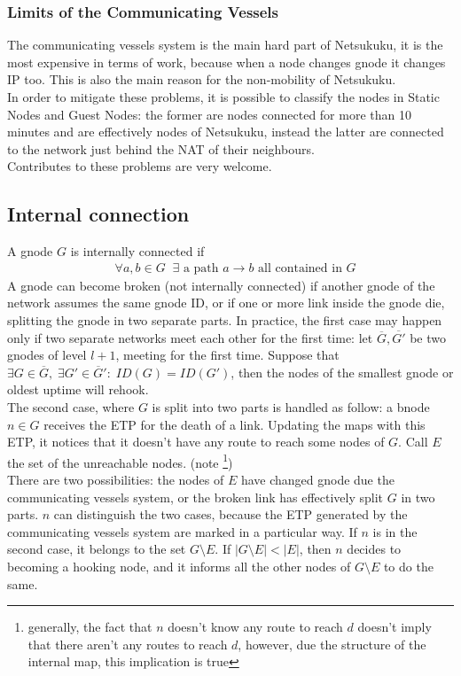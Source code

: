 \documentclass[a4paper]{article}
\newcommand{\T}[1]{\textrm{#1}}
\newcommand{\eal}[1]{{\begin{align*} #1 \end{align*}}}
\def\ove#1{{\overline{#1}}}
\def\-{{\setminus}}
\begin{document}
\subsubsection{Limits of the Communicating Vessels}
The communicating vessels system is the main hard part of Netsukuku, it is the
most expensive in terms of work, because when a node changes gnode it changes
IP too. This is also the main reason for the non-mobility of Netsukuku.\\
In order to mitigate these problems, it is possible to classify the nodes in
Static Nodes and Guest Nodes: the former are nodes connected for more than 10
minutes and are effectively nodes of Netsukuku, instead the latter are
connected to the network just behind the NAT of their neighbours.\\

Contributes to these problems are very welcome.

\subsection{Internal connection}
A gnode $G$ is internally connected if
\eal{&\forall a,b\in G\;\;\exists \T{ a path $a\rightarrow b$ all contained in $G$}}
A gnode can become broken (not internally connected) if another gnode of the
network assumes the same gnode ID, or if one or more link inside the gnode
die, splitting the gnode in two separate parts. In practice, the
first case may happen only if two separate networks meet each other for the
first time: let $\ove G, \ove {G'}$ be two gnodes of level $l+1$, meeting for the first time. 
Suppose that $\exists G\in \ove G,\;\exists G'\in \ove G':\; ID(G)=ID(G')$, then the nodes 
of the smallest gnode or oldest uptime will rehook.\\
The second case, where $G$ is split into two parts is handled as follow:
a bnode $n\in G$ receives the ETP for the death of a link.
Updating the maps with this ETP, it notices that it doesn't
have any route to reach some nodes of $G$. Call $E$ the set of
the unreachable nodes. (note \footnote{generally, the fact that $n$ doesn't
know any route to reach $d$ doesn't imply that there aren't any routes to
reach $d$, however, due the structure of the internal map, this implication is true})\\
There are two possibilities: the nodes of $E$ have changed
gnode due the communicating vessels system, or the broken link
has effectively split $G$ in two parts.
$n$ can distinguish the two cases, because the ETP generated
by the communicating vessels system are marked in a particular way.
If $n$ is in the second case, it belongs to the set $G\-E$. If
$|G\-E| < |E|$, then $n$ decides to becoming a hooking node, and it informs
all the other nodes of $G\-E$ to do the same.
\end{document}
